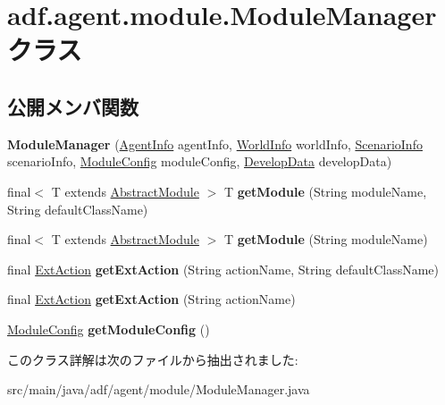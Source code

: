 \hypertarget{classadf_1_1agent_1_1module_1_1ModuleManager}{}\section{adf.\+agent.\+module.\+Module\+Manager クラス}
\label{classadf_1_1agent_1_1module_1_1ModuleManager}
\subsection*{公開メンバ関数}
\begin{DoxyCompactItemize}
\item 
\hypertarget{classadf_1_1agent_1_1module_1_1ModuleManager_ac16f2c9e14069d9b77054a12e5b58b15}{}\label{classadf_1_1agent_1_1module_1_1ModuleManager_ac16f2c9e14069d9b77054a12e5b58b15} 
{\bfseries Module\+Manager} (\hyperlink{classadf_1_1agent_1_1info_1_1AgentInfo}{Agent\+Info} agent\+Info, \hyperlink{classadf_1_1agent_1_1info_1_1WorldInfo}{World\+Info} world\+Info, \hyperlink{classadf_1_1agent_1_1info_1_1ScenarioInfo}{Scenario\+Info} scenario\+Info, \hyperlink{classadf_1_1agent_1_1config_1_1ModuleConfig}{Module\+Config} module\+Config, \hyperlink{classadf_1_1agent_1_1develop_1_1DevelopData}{Develop\+Data} develop\+Data)
\item 
\hypertarget{classadf_1_1agent_1_1module_1_1ModuleManager_a53d335af22bbe454bd59eab127e5f0d0}{}\label{classadf_1_1agent_1_1module_1_1ModuleManager_a53d335af22bbe454bd59eab127e5f0d0} 
final$<$ T extends \hyperlink{classadf_1_1component_1_1module_1_1AbstractModule}{Abstract\+Module} $>$ T {\bfseries get\+Module} (String module\+Name, String default\+Class\+Name)
\item 
\hypertarget{classadf_1_1agent_1_1module_1_1ModuleManager_a97f961775277112b300c281b55b2571f}{}\label{classadf_1_1agent_1_1module_1_1ModuleManager_a97f961775277112b300c281b55b2571f} 
final$<$ T extends \hyperlink{classadf_1_1component_1_1module_1_1AbstractModule}{Abstract\+Module} $>$ T {\bfseries get\+Module} (String module\+Name)
\item 
\hypertarget{classadf_1_1agent_1_1module_1_1ModuleManager_a728d6363557aeca0b9df294a47eca680}{}\label{classadf_1_1agent_1_1module_1_1ModuleManager_a728d6363557aeca0b9df294a47eca680} 
final \hyperlink{classadf_1_1component_1_1extaction_1_1ExtAction}{Ext\+Action} {\bfseries get\+Ext\+Action} (String action\+Name, String default\+Class\+Name)
\item 
\hypertarget{classadf_1_1agent_1_1module_1_1ModuleManager_a6c4b4d88631190f3d7f2254918d934fa}{}\label{classadf_1_1agent_1_1module_1_1ModuleManager_a6c4b4d88631190f3d7f2254918d934fa} 
final \hyperlink{classadf_1_1component_1_1extaction_1_1ExtAction}{Ext\+Action} {\bfseries get\+Ext\+Action} (String action\+Name)
\item 
\hypertarget{classadf_1_1agent_1_1module_1_1ModuleManager_aea388134b8a03bf6237eb5874da9e095}{}\label{classadf_1_1agent_1_1module_1_1ModuleManager_aea388134b8a03bf6237eb5874da9e095} 
\hyperlink{classadf_1_1agent_1_1config_1_1ModuleConfig}{Module\+Config} {\bfseries get\+Module\+Config} ()
\end{DoxyCompactItemize}


このクラス詳解は次のファイルから抽出されました\+:\begin{DoxyCompactItemize}
\item 
src/main/java/adf/agent/module/Module\+Manager.\+java\end{DoxyCompactItemize}

